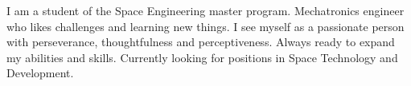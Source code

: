 
\begin{cvparagraph}

I am a student of the Space Engineering master program. Mechatronics
engineer who likes challenges and learning new things. I see myself as
a passionate person with perseverance, thoughtfulness and
perceptiveness. Always ready to expand my abilities and skills.
Currently looking for positions in Space Technology and Development.

\end{cvparagraph}
